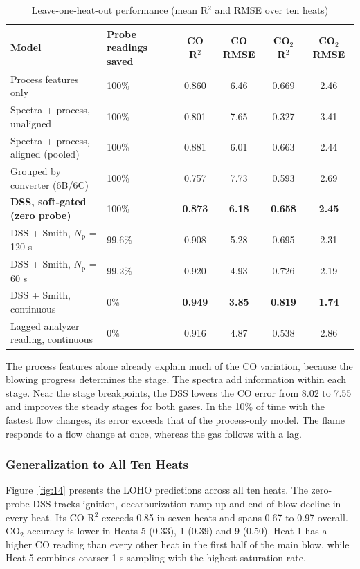 \begin{table}[!htbp]
\centering\small
\caption{Leave-one-heat-out performance (mean R\ensuremath{^{2}} and RMSE over ten heats)}\label{tab:8}
\renewcommand{\arraystretch}{1.12}
\begin{tabularx}{\linewidth}{@{}Z K{.15\linewidth} c c c c@{}}
\toprule
\textbf{Model} & \textbf{Probe readings saved} & \textbf{CO R\ensuremath{^{2}}} & \textbf{CO RMSE} & \textbf{CO\ensuremath{_{2}} R\ensuremath{^{2}}} & \textbf{CO\ensuremath{_{2}} RMSE} \\
\midrule
Process features only & 100\% & 0.860 & 6.46 & 0.669 & 2.46 \\
Spectra + process, unaligned & 100\% & 0.801 & 7.65 & 0.327 & 3.41 \\
Spectra + process, aligned (pooled) & 100\% & 0.881 & 6.01 & 0.663 & 2.44 \\
Grouped by converter (6B/6C) & 100\% & 0.757 & 7.73 & 0.593 & 2.69 \\
\textbf{DSS, soft-gated (zero probe)} & 100\% & \textbf{0.873} & \textbf{6.18} & \textbf{0.658} & \textbf{2.45} \\
DSS + Smith, $N_{\mathrm{p}}$ = 120 s & 99.6\% & 0.908 & 5.28 & 0.695 & 2.31 \\
DSS + Smith, $N_{\mathrm{p}}$ = 60 s & 99.2\% & 0.920 & 4.93 & 0.726 & 2.19 \\
DSS + Smith, continuous & 0\% & \textbf{0.949} & \textbf{3.85} & \textbf{0.819} & \textbf{1.74} \\
Lagged analyzer reading, continuous & 0\% & 0.916 & 4.87 & 0.538 & 2.86 \\
\bottomrule
\end{tabularx}
\end{table}

The process features alone already explain much of the CO variation, because the blowing progress determines the stage. The spectra add information within each stage. Near the stage breakpoints, the DSS lowers the CO error from 8.02 to 7.55 and improves the steady stages for both gases. In the 10\% of time with the fastest flow changes, its error exceeds that of the process-only model. The flame responds to a flow change at once, whereas the gas follows with a lag.

\subsubsection{Generalization to All Ten Heats}\label{sec:7.3.2}

Figure~\ref{fig:14} presents the LOHO predictions across all ten heats. The zero-probe DSS tracks ignition, decarburization ramp-up and end-of-blow decline in every heat. Its CO R\ensuremath{^{2}} exceeds 0.85 in seven heats and spans 0.67 to 0.97 overall. CO\ensuremath{_{2}} accuracy is lower in Heats 5 (0.33), 1 (0.39) and 9 (0.50). Heat 1 has a higher CO reading than every other heat in the first half of the main blow, while Heat 5 combines coarser 1-s sampling with the highest saturation rate.

